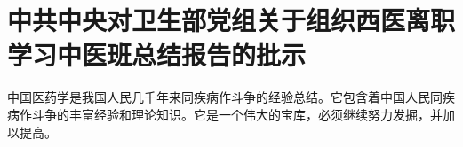 \section[中共中央对卫生部党组关于组织西医离职学习中医班总结报告的批示（一九五八年十一月十八日）]{中共中央对卫生部党组关于组织西医离职学习中医班总结报告的批示}


中国医药学是我国人民几千年来同疾病作斗争的经验总结。它包含着中国人民同疾病作斗争的丰富经验和理论知识。它是一个伟大的宝库，必须继续努力发掘，并加以提高。


